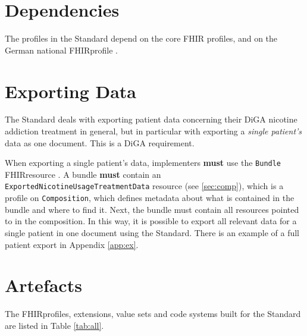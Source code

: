 \documentclass[12px]{report}
\def\code#1{\texttt{#1}} %
\newcommand{\fhir}{FHIR\textsuperscript{\textregistered}}
\begin{document}
\section{Dependencies}

The profiles in the Standard depend on the core \fhir \cite{FHIR} profiles, and on the German national \fhir profile \cite{debasis}.

\section{Exporting Data}
\label{sec:export}

The Standard deals with exporting patient data concerning their DiGA nicotine addiction treatment in general,
but in particular with exporting a \textit{single patient's} data as one document. This is a DiGA requirement.

When exporting a single patient's data, implementers \textbf{must} use the \code{Bundle} \fhir resource \cite{bundle}. A bundle \textbf{must} contain an \code{ExportedNicotineUsageTreatmentData} resource (see \ref{sec:comp}), which is a profile on \code{Composition},
which defines metadata about what is contained in the bundle and where to find it. Next, the bundle must contain all resources pointed to in the composition. In this way, it is possible
to export all relevant data for a single patient in one document using the Standard. There is an example of a full patient export in Appendix \ref{app:ex}.

\section{Artefacts}
The \fhir profiles, extensions, value sets and code systems built for the Standard are listed in Table \ref{tab:all}.
\end{document}
